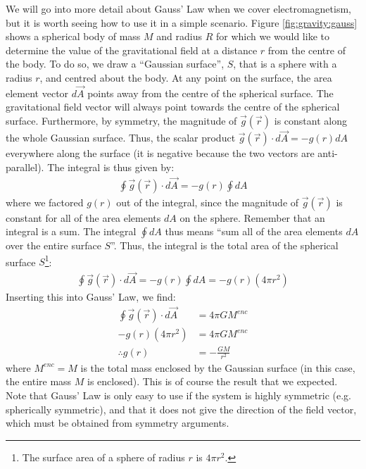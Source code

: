 We will go into more detail about Gauss' Law when we cover electromagnetism, but it is worth seeing how to use it in a simple scenario. Figure \ref{fig:gravity:gauss} shows a spherical body of mass $M$ and radius $R$ for which we would like to determine the value of the gravitational field at a distance $r$ from the centre of the body.
To do so, we draw a ``Gaussian surface'', $S$, that is a sphere with a radius $r$, and centred about the body. At any point on the surface, the area element vector $d\vec A$ points away from the centre of the spherical surface. The gravitational field vector will always point towards the centre of the spherical surface. Furthermore, by symmetry, the magnitude of $\vec g(\vec r)$ is constant along the whole Gaussian surface. Thus, the scalar product $\vec g(\vec r) \cdot d\vec A=-g(r)dA$ everywhere along the surface (it is negative because the two vectors are anti-parallel). The integral is thus given by:
\begin{align*}
\oint \vec g(\vec r) \cdot d\vec A = -g(r)\oint dA 
\end{align*}
where we factored $g(r)$ out of the integral, since the magnitude of $\vec g(\vec r)$ is constant for all of the area elements $dA$ on the sphere. Remember that an integral is a sum. The integral $\oint dA$ thus means ``sum all of the area elements $dA$ over the entire surface $S$''. Thus, the integral is the total area of the spherical surface $S$\footnote{The surface area of a sphere of radius $r$ is $4\pi r^2$.}:
\begin{align*}
\oint \vec g(\vec r) \cdot d\vec A = -g(r)\oint dA =-g(r)(4\pi r^2)
\end{align*}
Inserting this into Gauss' Law, we find:
\begin{align*}
\oint \vec g(\vec r) \cdot d\vec A &= 4\pi G M^{enc}\\
-g(r)(4\pi r^2) &= 4\pi G M^{enc}\\
\therefore g(r) &= - \frac{GM}{r^2}
\end{align*}
where $M^{enc}=M$ is the total mass enclosed by the Gaussian surface (in this case, the entire mass $M$ is enclosed). This is of course the result that we expected. Note that Gauss' Law is only easy to use if the system is highly symmetric (e.g. spherically symmetric), and that it does not give the direction of the field vector, which must be obtained from symmetry arguments. \\

